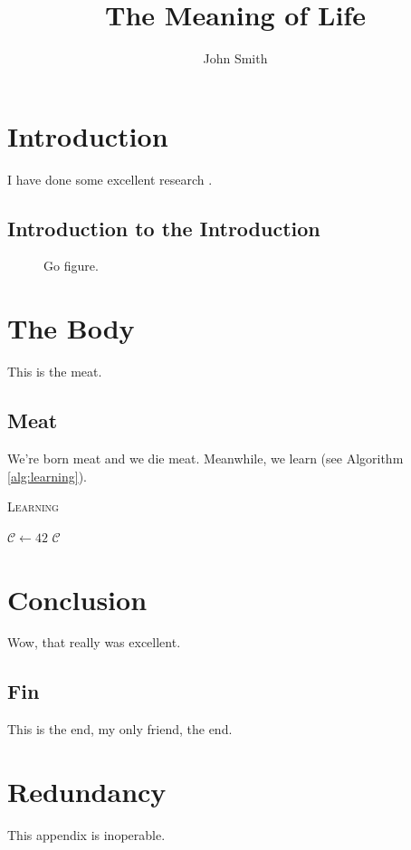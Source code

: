 \documentclass[onehalf,11pt]{beavtex}
\title{The Meaning of Life}
\author{John Smith}
\begin{document}
\maketitle

\mainmatter

\chapter{Introduction}
I have done some excellent research \cite{matrix}.
\section{Introduction to the Introduction}
\begin{figure}[!ht]
\centering
{}
\caption{Go figure.}
\end{figure}

\chapter{The Body}
This is the meat.
\section{Meat}
We're born meat and we die meat. Meanwhile, we learn (see Algorithm \ref{alg:learning}).

\begin{algorithm}[h]
\caption{\textsc{Learning}}
\label{alg:learning}
\begin{algorithmic}[1]
	\STATE $\mathcal{C} \gets 42$
	\RETURN $\mathcal{C}$
\end{algorithmic}
\end{algorithm}

\chapter{Conclusion}
Wow, that really was excellent.
\section{Fin}
This is the end, my only friend, the end.





\appendix
\chapter{Redundancy}
This appendix is inoperable.
\end{document}
